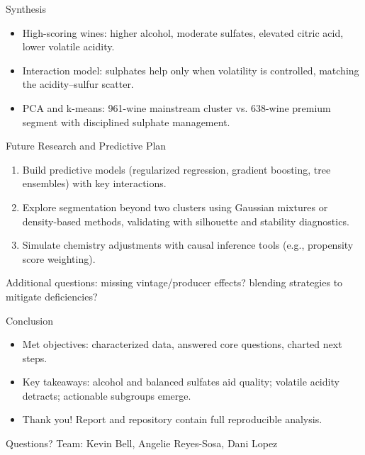 \documentclass[aspectratio=169]{beamer}
\begin{document}
\begin{frame}{Synthesis}
  \begin{itemize}
    \item High-scoring wines: higher alcohol, moderate sulfates, elevated citric acid, lower volatile acidity.
    \item Interaction model: sulphates help only when volatility is controlled, matching the acidity--sulfur scatter.
    \item PCA and k-means: 961-wine mainstream cluster vs. 638-wine premium segment with disciplined sulphate management.
  \end{itemize}
\end{frame}

\begin{frame}{Future Research and Predictive Plan}
  \begin{enumerate}
    \item Build predictive models (regularized regression, gradient boosting, tree ensembles) with key interactions.
    \item Explore segmentation beyond two clusters using Gaussian mixtures or density-based methods, validating with silhouette and stability diagnostics.
    \item Simulate chemistry adjustments with causal inference tools (e.g., propensity score weighting).
  \end{enumerate}
  \vspace{0.5em}
  \small Additional questions: missing vintage/producer effects? blending strategies to mitigate deficiencies?
\end{frame}

\begin{frame}{Conclusion}
  \begin{itemize}
    \item Met objectives: characterized data, answered core questions, charted next steps.
    \item Key takeaways: alcohol and balanced sulfates aid quality; volatile acidity detracts; actionable subgroups emerge.
    \item Thank you! Report and repository contain full reproducible analysis.
  \end{itemize}
\end{frame}

\begin{frame}[standout]
  Questions?\newline
  \small Team: Kevin Bell, Angelie Reyes-Sosa, Dani Lopez\
\end{frame}
\end{document}
